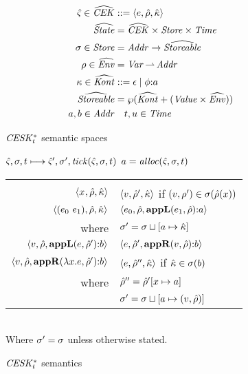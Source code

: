 \begin{figure}
  \centering
  \begin{align*}
    \hat\varsigma \in \widehat{\mathit{CEK}} &::= \langle e, \hat{\rho}, \hat{\kappa} \rangle \\
    \widehat{\mathit{State}} &= \widehat{\mathit{CEK}} \times \mathit{Store} \times \mathit{Time} \\
    \sigma \in \mathit{Store} &= \mathit{Addr} \to \widehat{\mathit{Storeable}} \\
    \rho \in \widehat{\mathit{Env}} &= \mathit{Var} \operatorname*{\rightharpoonup} \mathit{Addr} \\
    \kappa \in \widehat{\mathit{Kont}} &::= \epsilon \mathrel{\mid} \phi{\tt :} a \\
    \widehat{\mathit{Storeable}} &= \wp(\widehat{\mathit{Kont}} + (\mathit{Value} \times \widehat{\mathit{Env}})) \\
    a,b \in \mathit{Addr} & \quad t,u \in \mathit{Time}
  \end{align*}
  \caption{$\mathit{CESK^*_t}$ semantic spaces}
  \label{fig:ceskstart-spaces}
\end{figure}

\begin{figure}
  \centering
  $\hat\varsigma,\sigma,t \longmapsto \hat\varsigma',\sigma',\mathit{tick}(\hat\varsigma,\sigma,t)$ \quad $a = \mathit{alloc}(\hat\varsigma,\sigma,t)$ \\
  \begin{tabular}{r|l}
    \hline\vspace{-3mm}\\
    $\langle x^{{}}, \hat{\rho}, \hat{\kappa} \rangle$
    &
    $\langle v, \hat{\rho}',\hat{\kappa} \rangle$ if $(v,\rho') \in \sigma(\hat{\rho}(x))$
    \\
    $\langle (e_{0}\ e_{1}){},\hat{\rho},\hat{\kappa} \rangle$
    &
    $\langle e_{0},\hat{\rho},\mathbf{appL}(e_{1},\hat{\rho}){\tt :} a \rangle$ \\
    where & $\sigma' = \sigma\sqcup[a \mapsto \hat{\kappa}]$
    \\
    $\langle v,\hat{\rho}, \mathbf{appL}(e,\hat{\rho}'){\tt :} b \rangle$
    &
    $\langle e,\hat{\rho}',\mathbf{appR}(v,\hat{\rho}){\tt :} b \rangle$
    \\
    $\langle v,\hat{\rho},\mathbf{appR}(\lambda{} x. e,\hat{\rho}'){\tt :} b \rangle$
    &
    $\langle e,\hat{\rho}'',\hat{\kappa} \rangle$ if $\hat{\kappa} \in \sigma(b)$ \\
    where & $\hat{\rho}'' = \hat{\rho}'[x\mapsto a]$ \\
          & $\sigma' = \sigma\sqcup[a \mapsto (v,\hat{\rho})]$
  \end{tabular} \\
  Where $\sigma' = \sigma$ unless otherwise stated.
  \caption{$\mathit{CESK^*_t}$ semantics}
  \label{fig:ceskstart-semantics}
\end{figure}

